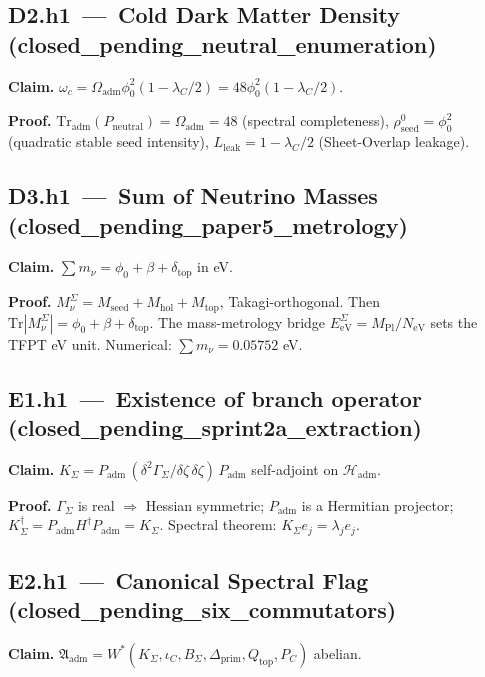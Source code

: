 \subsection*{D2.h1 \,---\, Cold Dark Matter Density
\,(\textsf{closed\_pending\_neutral\_enumeration})}
\textbf{Claim.}
\(\omega_c=\Omega_{\mathrm{adm}}\phi_0^2(1-\lambda_C/2)
=48\phi_0^2(1-\lambda_C/2)\).

\textbf{Proof.}
\(\mathrm{Tr}_{\mathrm{adm}}(P_{\mathrm{neutral}})=\Omega_{\mathrm{adm}}=48\)
(spectral completeness),
\(\rho_{\mathrm{seed}}^0=\phi_0^2\) (quadratic stable seed intensity),
\(L_{\mathrm{leak}}=1-\lambda_C/2\) (Sheet-Overlap leakage).

\subsection*{D3.h1 \,---\, Sum of Neutrino Masses
\,(\textsf{closed\_pending\_paper5\_metrology})}
\textbf{Claim.}
\(\sum m_\nu=\phi_0+\beta+\delta_{\mathrm{top}}\) in eV.

\textbf{Proof.}
\(M_\nu^\Sigma=M_{\mathrm{seed}}+M_{\mathrm{hol}}+M_{\mathrm{top}}\),
Takagi-orthogonal.  Then
\(\mathrm{Tr}|M_\nu^\Sigma|=\phi_0+\beta+\delta_{\mathrm{top}}\).
The mass-metrology bridge \(E_{\mathrm{eV}}^\Sigma=M_{\mathrm{Pl}}/N_{\mathrm{eV}}\)
sets the TFPT eV unit.  Numerical: \(\sum m_\nu=0.05752\) eV.

\subsection*{E1.h1 \,---\, Existence of branch operator
\,(\textsf{closed\_pending\_sprint2a\_extraction})}
\textbf{Claim.}
\(K_\Sigma=P_{\mathrm{adm}}\,(\delta^2\Gamma_\Sigma/\delta\zeta\,\delta\zeta)\,P_{\mathrm{adm}}\)
self-adjoint on \(\mathcal H_{\mathrm{adm}}\).

\textbf{Proof.}
\(\Gamma_\Sigma\) is real \(\Rightarrow\) Hessian symmetric;
\(P_{\mathrm{adm}}\) is a Hermitian projector;
\(K_\Sigma^\dagger=P_{\mathrm{adm}}H^\dagger P_{\mathrm{adm}}=K_\Sigma\).
Spectral theorem: \(K_\Sigma e_j=\lambda_j e_j\).

\subsection*{E2.h1 \,---\, Canonical Spectral Flag
\,(\textsf{closed\_pending\_six\_commutators})}
\textbf{Claim.}
\(\mathfrak A_{\mathrm{adm}}=W^\ast(K_\Sigma,\iota_C,B_\Sigma,
\Delta_{\mathrm{prim}},Q_{\mathrm{top}},P_C)\) abelian.

